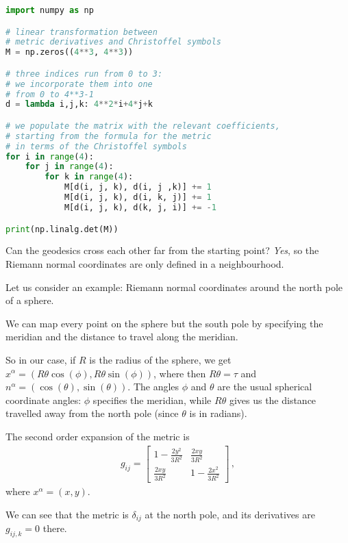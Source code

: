 \documentclass[main.tex]{subfiles}
\begin{document}
\begin{lstlisting}[language=Python]
import numpy as np

# linear transformation between
# metric derivatives and Christoffel symbols
M = np.zeros((4**3, 4**3))

# three indices run from 0 to 3:
# we incorporate them into one
# from 0 to 4**3-1
d = lambda i,j,k: 4**2*i+4*j+k

# we populate the matrix with the relevant coefficients,
# starting from the formula for the metric
# in terms of the Christoffel symbols
for i in range(4):
    for j in range(4):
        for k in range(4):
            M[d(i, j, k), d(i, j ,k)] += 1
            M[d(i, j, k), d(i, k, j)] += 1
            M[d(i, j, k), d(k, j, i)] += -1

print(np.linalg.det(M))
\end{lstlisting}

Can the geodesics cross each other far from the starting point? \emph{Yes}, so the Riemann normal coordinates are only defined in a neighbourhood.

Let us consider an example: Riemann normal coordinates around the north pole of a sphere.

We can map every point on the sphere but the south pole by specifying the meridian and the distance to travel along the meridian.

So in our case, if \(R\) is the radius of the sphere, we get \(x^{\alpha } = (R \theta \cos(\phi ), R \theta \sin(\phi ))\), where then \(R \theta = \tau \) and \(n^{\alpha } = (\cos(\theta ), \sin(\theta ))\).
The angles \(\phi \) and \(\theta \) are the usual spherical coordinate angles: \(\phi \) specifies the meridian, while \(R\theta \) gives us the distance travelled away from the north pole (since \(\theta \) is in radians).

The second order expansion of the metric is 
%
\begin{subequations}
\begin{align}
  g_{ij} = \left[\begin{array}{cc}
  1 - \frac{2y^2}{3R^2} & \frac{2xy}{3R^2} \\ 
  \frac{2xy}{3R^2} & 1-\frac{2x^2}{3R^2}
  \end{array}\right]
\,,
\end{align}
\end{subequations}
%
where \(x^{\alpha } = (x, y)\).

We can see that the metric is \(\delta_{ij}\) at the north pole, and its derivatives are \(g_{ij,k}= 0\) there.
\end{document}
